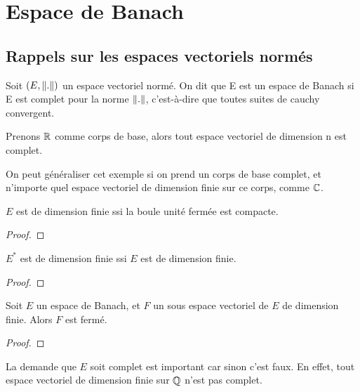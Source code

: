 \chapter{Espace de Banach}

\section{Rappels sur les espaces vectoriels normés}

\begin{definition} 
	Soit $(E, \norm{.})$ un espace vectoriel normé. On dit que E
	est un espace de Banach si E est complet pour la norme $\norm{.}$,
	c'est-à-dire que toutes suites de cauchy convergent.
\end{definition}

Prenons $\mathbb{R}$ comme corps de base, alors tout espace vectoriel de dimension n
est complet.

On peut généraliser cet exemple si on prend un corps de base complet, et
n'importe quel espace vectoriel de dimension finie sur ce corps, comme
$\mathbb{C}$.

\begin{theorem} [Riesz]
\label{theorem_riesz_compact}
	$E$ est de dimension finie ssi la boule unité fermée est compacte.
\end{theorem}

\begin{proof}

\end{proof}

\begin{proposition}
\label{proposition_dual_dimension}
	$E^{*}$ est de dimension finie ssi $E$ est de dimension finie.
\end{proposition}

\begin{proof}

\end{proof}

\begin{theorem}
\label{theorem_closed_vectorial_subspace}
	Soit $E$ un espace de Banach, et $F$ un sous espace vectoriel de $E$ de
	dimension finie.
	Alors $F$ est fermé.
\end{theorem}

\begin{proof}

\end{proof}

\begin{remarque}
	La demande que $E$ soit complet est important car sinon c'est faux. En
	effet, tout espace vectoriel de dimension finie sur $\mathbb{Q}$ n'est pas
	complet.
\end{remarque}

